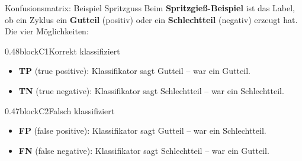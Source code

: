 \begin{frame}{Konfusionsmatrix: Beispiel Spritzguss}
Beim \textbf{Spritzgieß-Beispiel} ist das Label, ob ein Zyklus ein
\textbf{Gutteil} (positiv) oder ein \textbf{Schlechtteil} (negativ)
erzeugt hat. Die vier Möglichkeiten:

\vspace{0.6em}
\begin{blockrow}
\begin{blockcol}{0.48\textwidth}{blockC1}{Korrekt klassifiziert}
\begin{itemize}
  \item \textbf{TP} (true positive): Klassifikator sagt Gutteil -- war ein
        Gutteil.
  \item \textbf{TN} (true negative): Klassifikator sagt Schlechtteil --
        war ein Schlechtteil.
\end{itemize}
\end{blockcol}

\begin{blockcol}{0.47\textwidth}{blockC2}{Falsch klassifiziert}
\begin{itemize}
  \item \textbf{FP} (false positive): Klassifikator sagt Gutteil -- war ein
        Schlechtteil.
  \item \textbf{FN} (false negative): Klassifikator sagt Schlechtteil --
        war ein Gutteil.
\end{itemize}
\end{blockcol}
\end{blockrow}
\end{frame}

